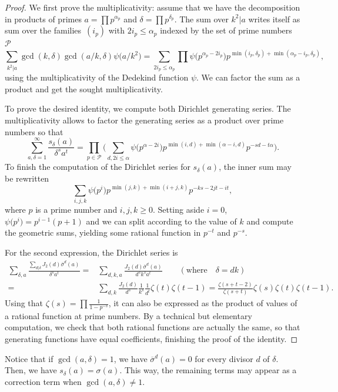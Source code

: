 \documentclass[pdftex]{sigma}
\renewcommand{\P}{\mathcal{P}}
\numberwithin{equation}{section}
\theoremstyle{definition}
\begin{document}
\begin{proof}
We first prove the multiplicativity: assume that we have the decomposition in products of primes $a=\prod p^{\alpha_p}$ and $\delta=\prod p^{\delta_p}$. The sum over $k^2|a$ writes itself as sum over the families~$(i_p)$ with $2i_p\leqslant \alpha_p$ indexed by the set of prime numbers $\P$
\[ \sum_{k^2|a}\gcd(k,\delta)\gcd(a/k,\delta)\psi\bigl(a/k^2\bigr) = \sum_{2i_p\leqslant \alpha_p}\prod \psi\bigl(p^{\alpha_p-2i_p}\bigr)p^{\min(i_p,\delta_p)+\min(\alpha_p-i_p,\delta_p)}, \]
using the multiplicativity of the Dedekind function $\psi$. We can factor the sum as a product and get the sought multiplicativity.

To prove the desired identity, we compute both Dirichlet generating series. The multiplicativity allows to factor the generating series as a product over prime numbers so that
\[ \sum_{a,\delta=1}^\infty \frac{s_\delta(a)}{\delta^sa^t} = \prod_{p\in\P} \biggl(\sum_{d,2i\leqslant\alpha} \psi\bigl(p^{\alpha-2i}\bigr)p^{\min(i,d)+\min(\alpha-i,d)}p^{-sd-t\alpha} \biggr). \]
To finish the computation of the Dirichlet series for $s_\delta(a)$, the inner sum may be rewritten
\[ \sum_{i,j,k}\psi\bigl(p^i\bigr)p^{\min(j,k)+\min(i+j,k)}p^{-ks-2jt-it}, \]
where $p$ is a prime number and $i,j,k\geqslant 0$. Setting aside $i=0$, $\psi\bigl(p^i\bigr)=p^{i-1}(p+1)$ and we can split according to the value of $k$ and compute the geometric sums, yielding some rational function in $p^{-t}$ and $p^{-s}$.

For the second expression, the Dirichlet series is
\begin{align*}
\sum_{\delta,a} \frac{\sum_{d|\delta} J_2(d)\overline{\sigma}^d(a)}{\delta^s a^t} ={} & \sum_{d,k,a}\frac{J_2(d)\overline{\sigma}^d(a)}{d^sk^sa^t} \qquad(\text{where}\quad\delta=dk) \\
= {}& \sum_{d,k} \frac{J_2(d)}{d^s}\frac{1}{k^s}\frac{1}{d^t}\zeta(t)\zeta(t-1)
= \frac{\zeta(s+t-2)}{\zeta(s+t)}\zeta(s)\zeta(t)\zeta(t-1).
\end{align*}
Using that $\zeta(s)=\prod\frac{1}{1-p^{-s}}$, it can also be expressed as the product of values of a rational function at prime numbers. By a technical but elementary computation, we check that both rational functions are actually the same, so that generating functions have equal coefficients, finishing the proof of the identity.
\end{proof}

Notice that if $\gcd(a,\delta)=1$, we have $\overline{\sigma}^d(a)=0$ for every divisor $d$ of $\delta$. Then, we have $s_\delta(a)=\sigma(a)$. This way, the remaining terms may appear as a correction term when $\gcd(a,\delta)\neq 1$.
\end{document}
